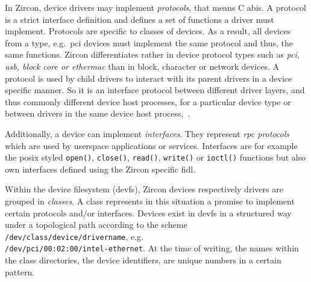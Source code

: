 In Zircon, device drivers may implement \textit{protocols}, that means C \acp{abi}.
A protocol is a strict interface definition and defines a set of functions a driver must implement.
Protocols are specific to classes of devices.
As a result, all devices from a type, e.g.\ \ac{pci} devices must implement the same protocol and thus, the same functions.
Zircon differentiates rather in device protocol types such as \textit{\ac{pci}, \ac{usb}, block core or ethermac} than in block, character or network devices.
A protocol is used by child drivers to interact with its parent drivers in a device specific manner.
So it is an interface protocol between different driver layers, and thus commonly different device host processes, for a particular device type or between drivers in the same device host process\cite{zircon-ddk-gettingstarted},~\cite{zircon-devicemodel}.

Additionally, a device can implement \textit{interfaces}.
They represent \textit{\ac{rpc} protocols} which are used by userspace applications or services.
Interfaces are for example the \ac{posix} styled \texttt{open()}, \texttt{close()}, \texttt{read()}, \texttt{write()} or \texttt{ioctl()} functions but also own interfaces defined using the Zircon specific \acf{fidl}\cite{zircon-devicemodel}.

Within the device filesystem (devfs), Zircon devices respectively drivers are grouped in \textit{classes}.
A class represents in this situation a promise to implement certain protocols and/or interfaces.
Devices exist in devfs in a structured way under a topological path according to the scheme \texttt{/dev/class/device/drivername}, e.g.\ \\
\texttt{/dev/pci/00:02:00/intel-ethernet}.
At the time of writing, the names within the class directories, the device identifiers, are unique numbers in a certain pattern\cite{zircon-devicemodel}.

%
